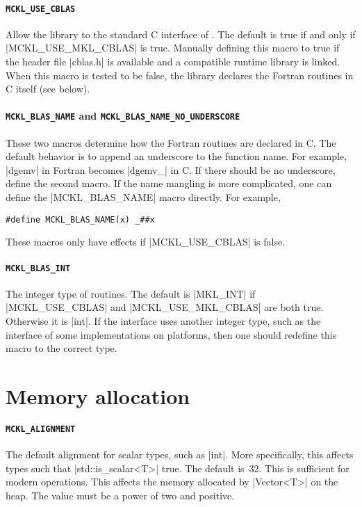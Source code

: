 \paragraph{\texttt{MCKL\_USE\_CBLAS}} Allow the library to the standard C
interface of \blas. The default is true if and only if |MCKL_USE_MKL_CBLAS| is
true. Manually defining this macro to true if the header file |cblas.h| is
available and a compatible runtime library is linked. When this macro is tested
to be false, the library declares the \blas Fortran routines in C itself (see
below).

\paragraph{\texttt{MCKL\_BLAS\_NAME} and
\texttt{MCKL\_BLAS\_NAME\_NO\_UNDERSCORE}} These two macros determine how the
\blas Fortran routines are declared in C. The default behavior is to append an
underscore to the function name. For example, |dgemv| in Fortran becomes
|dgemv_| in C. If there should be no underscore, define the second macro. If
the name mangling is more complicated, one can define the |MCKL_BLAS_NAME|
macro directly. For example,
\begin{verbatim}
#define MCKL_BLAS_NAME(x) _##x
\end{verbatim}
These macros only have effects if |MCKL_USE_CBLAS| is false.

\paragraph{\texttt{MCKL\_BLAS\_INT}} The integer type of \blas routines. The
default is |MKL_INT| if |MCKL_USE_CBLAS| and |MCKL_USE_MKL_CBLAS| are both
true. Otherwise it is |int|. If the \blas interface uses another integer type,
such as the \ilp interface of some implementations on \lp platforms, then one
should redefine this macro to the correct type.

\section{Memory allocation}
\label{sec:Memory allocation}

\paragraph{\texttt{MCKL\_ALIGNMENT}} The default alignment for scalar types,
such as |int|. More specifically, this affects types such that
|std::is_scalar<T>| true. The default is~32. This is sufficient for modern
\simd operations. This affects the memory allocated by |Vector<T>| on the heap.
The value must be a power of two and positive.

